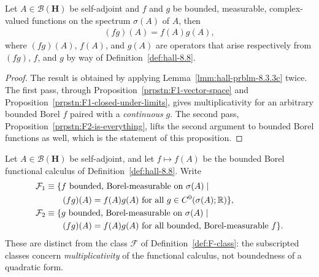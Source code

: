 \begin{proposition}
    \label{prpstn:hall-8.9}
    \leanok
    Let $A \in \mathcal{B}(\mathbf{H})$ be self-adjoint and $f$ and $g$ be bounded, measurable, complex-valued functions on the spectrum $\sigma(A)$ of $A$, then
    \begin{align}
        (fg)(A) = f(A) g(A),
    \end{align}
    where $(fg)(A)$, $f(A)$, and $g(A)$ are operators that arise respectively from $(fg)$, $f$, and $g$ by way of Definition~\ref{def:hall-8.8}.
\end{proposition}
\begin{proof}
    \leanok
The result is obtained by applying Lemma~\ref{lmm:hall-prblm-8.3.3c} twice. The first pass, through Proposition~\ref{prpstn:F1-vector-space} and Proposition~\ref{prpstn:F1-closed-under-limits}, gives multiplicativity for an arbitrary bounded Borel $f$ paired with a \textit{continuous} $g$. The second pass, Proposition~\ref{prpstn:F2-is-everything}, lifts the second argument to bounded Borel functions as well, which is the statement of this proposition.
\end{proof}

\begin{definition}
    \label{def:F1-F2-classes}
    \leanok
    Let $A \in \mathcal{B}(\mathbf{H})$ be self-adjoint, and let $f \mapsto f(A)$ be the bounded Borel functional calculus of Definition~\ref{def:hall-8.8}. Write
    \begin{align}
        \mathcal{F}_1 &\equiv \{ f \text{ bounded, Borel-measurable on } \sigma(A) \mid \notag \\
            &\qquad (fg)(A) = f(A)g(A) \text{ for all } g \in C^0(\sigma(A); \mathbb{R}) \}, \\
        \mathcal{F}_2 &\equiv \{ g \text{ bounded, Borel-measurable on } \sigma(A) \mid \notag \\
            &\qquad (fg)(A) = f(A)g(A) \text{ for all bounded, Borel-measurable } f \}.
    \end{align}
    These are distinct from the class $\mathcal{F}$ of Definition~\ref{def:F-class}: the subscripted classes concern \textit{multiplicativity} of the functional calculus, not boundedness of a quadratic form.
\end{definition}

